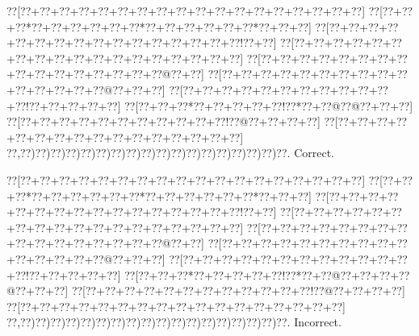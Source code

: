 \documentclass[a5paper]{article}
\begin{document}
\begin{center}
{\goo
\0??[\0??+\0??+\0??+\0??+\0??+\0??+\0??+\0??+\0??+\0??+\0??+\0??+\0??+\0??+\0??+\0??+\0??+\0??]
\0??[\0??+\0??+\0??*\0??+\0??+\0??+\0??+\0??+\0??*\0??+\0??+\0??+\0??+\0??+\0??*\0??+\0??+\0??]
\0??[\0??+\0??+\0??+\0??+\0??+\0??+\0??+\0??+\0??+\0??+\0??+\0??+\0??+\0??+\0??+\0??!\0??+\0??]
\0??[\0??+\0??+\0??+\0??+\0??+\0??+\0??+\0??+\0??+\0??+\0??+\0??+\0??+\0??+\0??+\0??+\0??+\0??]
\0??[\0??+\0??+\0??+\0??+\0??+\0??+\0??+\0??+\0??+\0??+\0??+\0??+\0??+\0??+\0??+\0??@\0??+\0??]
\0??[\0??+\0??+\0??+\0??+\0??+\0??+\0??+\0??+\0??+\0??+\0??+\0??+\0??+\0??+\0??@\0??+\0??+\0??]
\0??[\0??+\0??+\0??+\0??+\0??+\0??+\0??+\0??+\0??+\0??+\0??+\0??!\0??+\0??+\0??+\0??+\0??]
\0??[\0??+\0??+\0??*\0??+\0??+\0??+\0??+\0??!\0??*\0??+\0??@\0??@\0??+\0??+\0??]
\0??[\0??+\0??+\0??+\0??+\0??+\0??+\0??+\0??+\0??+\0??+\0??!\0??@\0??+\0??+\0??+\0??]
\0??[\0??+\0??+\0??+\0??+\0??+\0??+\0??+\0??+\0??+\0??+\0??+\0??+\0??+\0??+\0??+\0??]
\0??,\0??)\0??)\0??)\0??)\0??)\0??)\0??)\0??)\0??)\0??)\0??)\0??)\0??)\0??)\0??)\0??)\0??)\0??.
}
Correct. 

\end{center}
\begin{center}
{\goo
\0??[\0??+\0??+\0??+\0??+\0??+\0??+\0??+\0??+\0??+\0??+\0??+\0??+\0??+\0??+\0??+\0??+\0??+\0??]
\0??[\0??+\0??+\0??*\0??+\0??+\0??+\0??+\0??+\0??*\0??+\0??+\0??+\0??+\0??+\0??*\0??+\0??+\0??]
\0??[\0??+\0??+\0??+\0??+\0??+\0??+\0??+\0??+\0??+\0??+\0??+\0??+\0??+\0??+\0??+\0??!\0??+\0??]
\0??[\0??+\0??+\0??+\0??+\0??+\0??+\0??+\0??+\0??+\0??+\0??+\0??+\0??+\0??+\0??+\0??+\0??+\0??]
\0??[\0??+\0??+\0??+\0??+\0??+\0??+\0??+\0??+\0??+\0??+\0??+\0??+\0??+\0??+\0??+\0??@\0??+\0??]
\0??[\0??+\0??+\0??+\0??+\0??+\0??+\0??+\0??+\0??+\0??+\0??+\0??+\0??+\0??+\0??@\0??+\0??+\0??]
\0??[\0??+\0??+\0??+\0??+\0??+\0??+\0??+\0??+\0??+\0??+\0??+\0??+\0??!\0??+\0??+\0??+\0??+\0??]
\0??[\0??+\0??+\0??*\0??+\0??+\0??+\0??+\0??!\0??*\0??+\0??@\0??+\0??+\0??+\0??@\0??+\0??+\0??]
\0??[\0??+\0??+\0??+\0??+\0??+\0??+\0??+\0??+\0??+\0??+\0??+\0??!\0??@\0??+\0??+\0??+\0??]
\0??[\0??+\0??+\0??+\0??+\0??+\0??+\0??+\0??+\0??+\0??+\0??+\0??+\0??+\0??+\0??+\0??+\0??]
\0??,\0??)\0??)\0??)\0??)\0??)\0??)\0??)\0??)\0??)\0??)\0??)\0??)\0??)\0??)\0??)\0??)\0??)\0??.
}
Incorrect. 

\end{center}
\newpage
\end{document}
